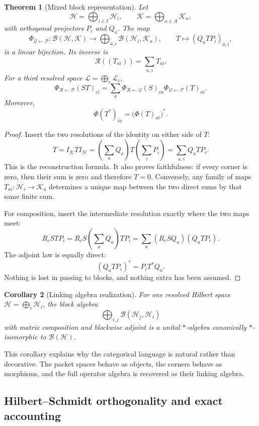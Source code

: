 \documentclass[11pt]{article}
\newtheorem{theorem}{Theorem}[section]
\newtheorem{corollary}[theorem]{Corollary}
\theoremstyle{definition}
\theoremstyle{remark}
\begin{document}
\begin{theorem}[Mixed block representation]
Let
\[
\mathcal H=\bigoplus_{i\in I}\mathcal H_i,
\qquad
\mathcal K=\bigoplus_{a\in A}\mathcal K_a,
\]
with orthogonal projectors \(P_i\) and \(Q_a\).  The map
\[
\Phi_{\mathcal Q\leftarrow\mathcal P}:
\mathcal B(\mathcal H,\mathcal K)
\longrightarrow
\bigoplus_{a,i}\mathcal B(\mathcal H_i,\mathcal K_a),
\qquad
T\longmapsto(Q_aTP_i)_{a,i},
\]
is a linear bijection.  Its inverse is
\[
\mathcal R((T_{ai}))=\sum_{a,i}T_{ai}.
\]
For a third resolved space \(\mathcal L=\bigoplus_c\mathcal L_c\),
\[
\Phi_{\mathcal R\leftarrow\mathcal P}(ST)_{ci}
=
\sum_a
\Phi_{\mathcal R\leftarrow\mathcal Q}(S)_{ca}
\Phi_{\mathcal Q\leftarrow\mathcal P}(T)_{ai}.
\]
Moreover,
\[
\Phi(T^*)_{ia}=\bigl(\Phi(T)_{ai}\bigr)^*.
\]
\end{theorem}

\begin{proof}
Insert the two resolutions of the identity on either side of \(T\):
\[
T
=I_\mathcal KTI_\mathcal H
=\left(\sum_aQ_a\right)T\left(\sum_iP_i\right)
=\sum_{a,i}Q_aTP_i.
\]
This is the reconstruction formula.  It also proves faithfulness: if every corner is zero, then their sum is zero and therefore \(T=0\).  Conversely, any family of maps \(T_{ai}:\mathcal H_i\to\mathcal K_a\) determines a unique map between the two direct sums by that same finite sum.

For composition, insert the intermediate resolution exactly where the two maps meet:
\[
R_cSTP_i
=R_cS\left(\sum_aQ_a\right)TP_i
=\sum_a(R_cSQ_a)(Q_aTP_i).
\]
The adjoint law is equally direct:
\[
(Q_aTP_i)^*=P_iT^*Q_a.
\]
Nothing is lost in passing to blocks, and nothing extra has been assumed.
\end{proof}

\begin{corollary}[Linking algebra realization]
For one resolved Hilbert space \(\mathcal H=\bigoplus_i\mathcal H_i\), the block algebra
\[
\bigoplus_{i,j}\mathcal B(\mathcal H_j,\mathcal H_i)
\]
with matrix composition and blockwise adjoint is a unital \(*\)-algebra canonically \(*\)-isomorphic to \(\mathcal B(\mathcal H)\).
\end{corollary}

This corollary explains why the categorical language is natural rather than decorative.  The packet spaces behave as objects, the corners behave as morphisms, and the full operator algebra is recovered as their linking algebra.

\subsection{Hilbert--Schmidt orthogonality and exact accounting}
\end{document}
